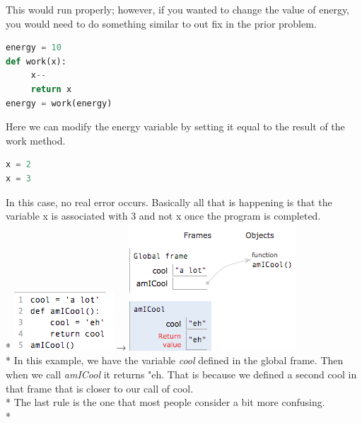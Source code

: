 \documentclass{article}
\begin{document}
This would run properly; however, if you wanted to change the value of energy, you would need to do something similar to out fix in the prior problem. 
\begin{lstlisting}[language = Python]
energy = 10
def work(x):
     x--
     return x
energy = work(energy)
\end{lstlisting}
Here we can modify the energy variable by setting it equal to the result of the work method. 
\begin{lstlisting}[language = Python]
x = 2
x = 3
\end{lstlisting}
In this case, no real error occurs. Basically all that is happening is that the variable x is associated with 3 and not x once the program is completed.  \\*
\includegraphics[scale=.7]{../images/cool1.png}{\Huge $\rightarrow$}\includegraphics[scale=.7]{../images/cool2.png} \\* \bigskip
In this example, we have the variable \emph{cool} defined in the global frame. Then when we call \emph{amICool} it returns "eh. That is because we defined a second cool in that frame that is closer to our call of cool. \\* \bigskip
The last rule is the one that most people consider a bit more confusing. \\* \bigskip
\end{document}
